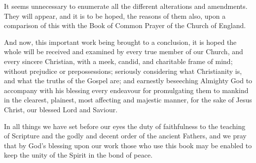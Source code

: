 It seems unnecessary to enumerate all the different alterations and amendments. They will appear, and it is to be hoped, the reasons of them also, upon a comparison of this with the Book of Common Prayer of the Church of England. %








And now, this important work being brought to a conclusion, it is hoped the whole will be received and examined by every true member of our Church, and every sincere Christian, with a meek, candid, and charitable frame of mind; without prejudice or prepossessions; seriously considering what Christianity is, and what the truths of the Gospel are; and earnestly beseeching Almighty God to accompany with his blessing every endeavour for promulgating them to mankind in the clearest, plainest, most affecting and majestic manner, for the sake of Jesus Christ, our blessed Lord and Saviour.  

In all things we have set before our eyes the duty of faithfulness to the teaching of Scripture and the godly and decent order of the ancient Fathers, and we pray that by God's blessing upon our work those who use this book may be enabled to keep the unity of the Spirit in the bond of peace.

